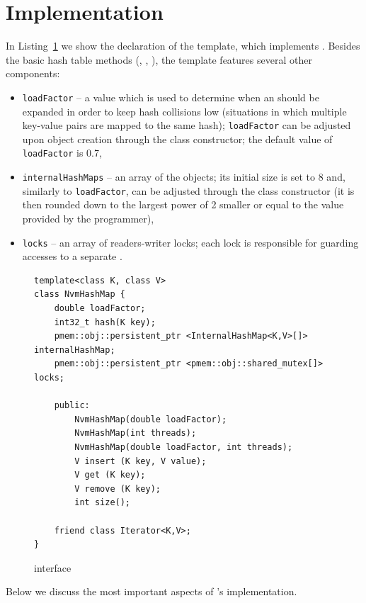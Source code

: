 \section{Implementation}

    In Listing~\ref{NvmHashMap} we show the declaration of the \NvmHashMap template, which implements \PHT. Besides the basic hash table methods (\getMethod, \insertMethod, \removeMethod), the template features several other components:
    \begin{itemize}
        \item \texttt{loadFactor} -- a value which is used to determine when an \internalHashMap should be expanded in order to keep hash collisions low (situations in which multiple key-value pairs are mapped to the same hash); \texttt{loadFactor} can be adjusted upon object creation through the class constructor; the default value of \texttt{loadFactor} is 0.7, 
        \item \texttt{internalHashMaps} -- an array of the \internalHashMap objects; its initial size is set to 8 and, similarly to \texttt{loadFactor}, can be adjusted through the class constructor (it is then rounded down to the largest power of 2 smaller or equal to the value provided by the programmer),
        \item \texttt{locks} -- an array of readers-writer locks; each lock is responsible for guarding accesses to a separate \internalHashMap.
    \end{itemize}

\begin{figure}[ht] 
\renewcommand{\figurename}{Listing}
    \begin{lstlisting}
template<class K, class V> 
class NvmHashMap {
    double loadFactor;
    int32_t hash(K key);
    pmem::obj::persistent_ptr <InternalHashMap<K,V>[]> internalHashMap;
    pmem::obj::persistent_ptr <pmem::obj::shared_mutex[]> locks;
    
    public: 
        NvmHashMap(double loadFactor);
        NvmHashMap(int threads);
        NvmHashMap(double loadFactor, int threads);
        V insert (K key, V value);
        V get (K key);
        V remove (K key);
        int size();
    
    friend class Iterator<K,V>;
}
    \end{lstlisting}
\label{NvmHashMap}
\caption{\NvmHashMap interface}
\end{figure}

    Below we discuss the most important aspects of \PHT's implementation.
    
